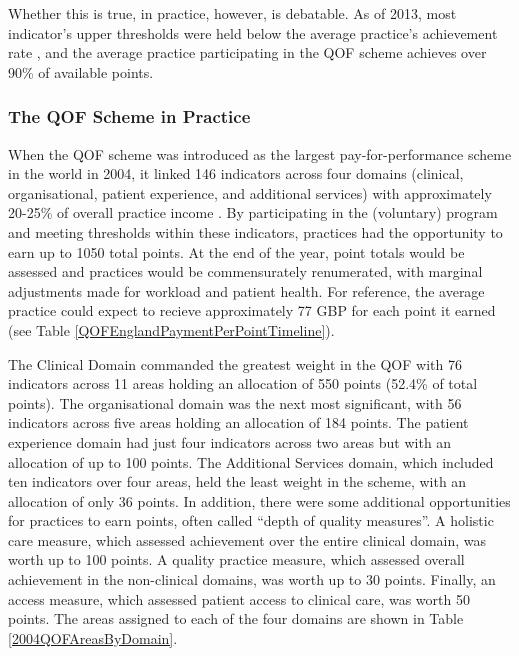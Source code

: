 \documentclass[12pt]{article}
\begin{document}
Whether this is true, in practice, however, is debatable. As of 2013, most indicator's upper thresholds were held below the average practice's achievement rate \citep{doranSettingPerformanceTargets2014}, and the average practice participating in the QOF scheme achieves over 90\% of available points.

\subsubsection{The QOF Scheme in Practice}

When the QOF scheme was introduced as the largest pay-for-performance scheme in the world in 2004, it linked 146 indicators across four domains (clinical, organisational, patient experience, and additional services) with approximately 20-25\% of overall practice income \citep{guthrieWorkloadRewardQuality2006}. By participating in the (voluntary) program and meeting thresholds within these indicators, practices had the opportunity to earn up to 1050 total points. At the end of the year, point totals would be assessed and practices would be commensurately renumerated, with marginal adjustments made for workload and patient health. For reference, the average practice could expect to recieve approximately 77 GBP for each point it earned (see Table \ref{QOFEnglandPaymentPerPointTimeline}).

The Clinical Domain commanded the greatest weight in the QOF with 76 indicators across 11 areas holding an allocation of 550 points (52.4\% of total points). The organisational domain was the next most significant, with 56 indicators across five areas holding an allocation of 184 points. The patient experience domain had just four indicators across two areas but with an allocation of up to 100 points. The Additional Services domain, which included ten indicators over four areas, held the least weight in the scheme, with an allocation of only 36 points. In addition, there were some additional opportunities for practices to earn points, often called ``depth of quality measures''. A holistic care measure, which assessed achievement over the entire clinical domain, was worth up to 100 points. A quality practice measure, which assessed overall achievement in the non-clinical domains, was worth up to 30 points. Finally, an access measure, which assessed patient access to clinical care, was worth 50 points. The areas assigned to each of the four domains are shown in Table \ref{2004QOFAreasByDomain}.
\end{document}
